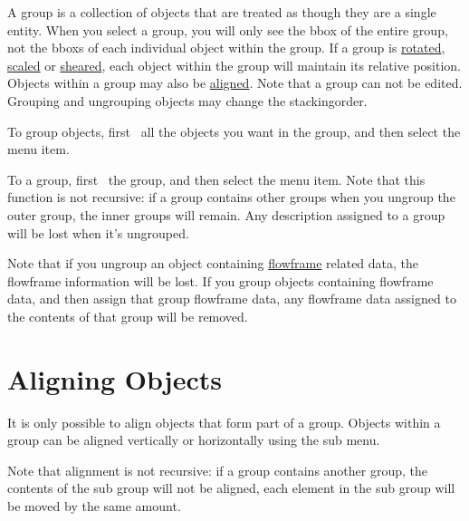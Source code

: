 A \gls{group} is a collection of \glspl{object} that are treated as
though they are a single entity. When you select a \gls{group}, you
will only see the \gls{bbox} of the entire group, not the
\glspl*{bbox} of each individual object within the group. If a
\gls{group} is \hyperref[sec:rotateobjects]{rotated},
\hyperref[sec:scaleobjects]{scaled} or \hyperref[sec:shearobjects]{sheared}, each
\gls*{object} within the group will maintain its relative position.
Objects within a \gls{group} may also be
\hyperref[sec:alignobjects]{aligned}.  Note that a \gls{group} can
not be edited. Grouping and ungrouping \glspl*{object} may change
the \gls{stackingorder}.


To group \glspl*{object}, first \select\
all the objects you want in the \gls{group}, and then select the
\menu{transform.group} menu item.


To  a group, first \select\ the
group, and then select the  menu item. Note
that this function is not recursive: if a group contains other
groups when you ungroup the outer group, the inner groups will
remain.  Any description assigned to a group will be lost when it's
ungrouped.

\begin{warning}
Note that if you ungroup an \gls*{object} containing
\hyperref[sec:flowframe]{flowframe} related
data, the \gls{flowframe} information will be lost. If you group objects
containing flowframe data, and then assign that group flowframe data,
any flowframe data assigned to the contents of that group will be
removed.
\end{warning}



\section{Aligning Objects}\label{sec:alignobjects}


It is only possible to align \glspl{object} that form part of a
\gls{group}. Objects within a group can be aligned vertically or
horizontally using the \menu{transform.justify} sub menu.

Note that alignment is not recursive: if a group contains another
group, the contents of the sub group will not be aligned, each
element in the sub group will be moved by the same amount.

